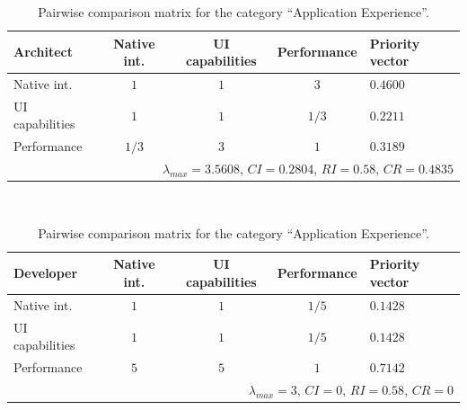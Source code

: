 
\begin{table}[h!]
    \begin{center}
        \begin{tabular}{lcccl}
            \hline
            \textbf{Architect}     & Native int. & UI capabilities & Performance & Priority vector \\ 
            \hline
            Native int.            & $1$         & $1$             & $3$         & $0.4600$        \\
            UI capabilities        & $1$         & $1$             & $1/3$       & $0.2211$        \\
            Performance            & $1/3$       & $3$             & $1$         & $0.3189$        \\
            \hline
            \multicolumn{5}{r}{$\lambda_{max} = 3.5608$, $CI = 0.2804$, $RI = 0.58$, $CR = 0.4835$}\\
            \hline
        \end{tabular}
        \\\vspace{1em}
        \begin{tabular}{lcccl}
            \hline
            \textbf{Developer}     & Native int. & UI capabilities & Performance & Priority vector \\ 
            \hline
            Native int.            & $1$         & $1$             & $1/5$       & $0.1428$        \\
            UI capabilities        & $1$         & $1$             & $1/5$       & $0.1428$        \\
            Performance            & $5$         & $5$             & $1$         & $0.7142$        \\
            \hline
            \multicolumn{5}{r}{$\lambda_{max} = 3$, $CI = 0$, $RI = 0.58$, $CR = 0$}               \\
            \hline
        \end{tabular}
        \caption{Pairwise comparison matrix for the category ``Application Experience''.}
        \label{tab:ae}
    \end{center}
\end{table}

